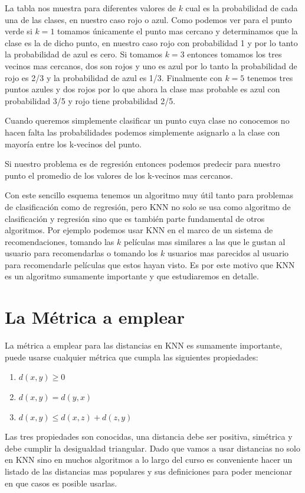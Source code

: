 La tabla nos muestra para diferentes valores de $k$ cual es la probabilidad de cada una de las clases, en nuestro caso rojo o azul. Como podemos ver para el punto verde si $k=1$ tomamos únicamente el punto mas cercano y determinamos que la clase es la de dicho punto, en nuestro caso rojo con probabilidad 1 y por lo tanto la probabilidad de azul es cero. Si tomamos $k=3$ entonces tomamos los tres vecinos mas cercanos, dos son rojos y uno es azul por lo tanto la probabilidad de rojo es 2/3 y la probabilidad de azul es 1/3. Finalmente con $k=5$ tenemos tres puntos azules y dos rojos por lo que ahora la clase mas probable es azul con probabilidad 3/5 y rojo tiene probabilidad 2/5.

Cuando queremos simplemente clasificar un punto cuya clase no conocemos no hacen falta las probabilidades podemos simplemente asignarlo a la clase con mayoría entre los k-vecinos del punto. 

Si nuestro problema es de regresión entonces podemos predecir para nuestro punto el promedio de los valores de los k-vecinos mas cercanos.

Con este sencillo esquema tenemos un algoritmo muy útil tanto para problemas de clasificación como de regresión, pero KNN no solo se usa como algoritmo de clasificación y regresión sino que es también parte fundamental de otros algoritmos. Por ejemplo podemos usar KNN en el marco de un sistema de recomendaciones, tomando las $k$ películas mas similares a las que le gustan al usuario para recomendarlas o tomando los $k$ usuarios mas parecidos al usuario para recomendarle películas que  estos hayan visto. Es por este motivo que KNN es un algoritmo sumamente importante y que estudiaremos en detalle.

\section{La Métrica a emplear}

La métrica a emplear para las distancias en KNN es sumamente importante, puede usarse cualquier métrica que cumpla las siguientes propiedades:
\begin{enumerate}
\item $d(x,y)\geq0$
\item $d(x,y) = d(y,x)$
\item $d(x,y)\leq d(x,z)+d(z,y)$
\end{enumerate}

Las tres propiedades son conocidas, una distancia debe ser positiva, simétrica y debe cumplir la desigualdad triangular.
Dado que vamos a usar distancias no solo en KNN sino en muchos algoritmos a lo largo del curso es conveniente hacer un listado de las distancias mas populares y sus definiciones para poder mencionar en que casos es posible usarlas.

